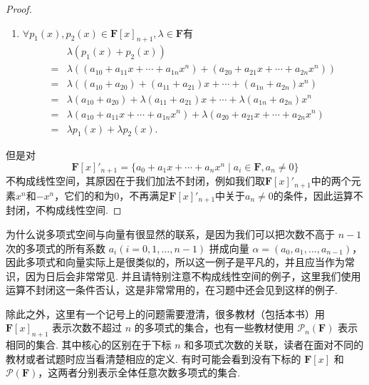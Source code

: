 \begin{proof}
\begin{enumerate}
        \item $\forall p_1(x), p_2(x) \in \mathbf{F}[x]_{n+1}, \lambda \in \mathbf{F}$有
              \begin{align*}
                      & \lambda(p_1(x) + p_2(x))                                                                        \\
                  ={} & \lambda((a_{10} + a_{11}x + \cdots + a_{1n}x^n) + (a_{20} + a_{21}x + \cdots + a_{2n}x^n))      \\
                  ={} & \lambda((a_{10} + a_{20}) + (a_{11} + a_{21})x + \cdots + (a_{1n} + a_{2n})x^n)                 \\
                  ={} & \lambda(a_{10} + a_{20}) + \lambda(a_{11} + a_{21})x + \cdots + \lambda(a_{1n} + a_{2n})x^n     \\
                  ={} & \lambda(a_{10} + a_{11}x + \cdots + a_{1n}x^n) + \lambda(a_{20} + a_{21}x + \cdots + a_{2n}x^n) \\
                  ={} & \lambda p_1(x) + \lambda p_2(x).
              \end{align*}
    \end{enumerate}
    但是对\[\mathbf{F}[x]'_{n+1}=\{a_0+a_1x+\cdots+a_nx^n \mid a_i\in\mathbf{F}, a_n\neq 0\}\]不构成线性空间，其原因在于我们加法不封闭，例如我们取$\mathbf{F}[x]'_{n+1}$中的两个元素$x^n$和$-x^n$，它们的和为$0$，不再满足$\mathbf{F}[x]'_{n+1}$中关于$a_n\neq 0$的条件，因此运算不封闭，不构成线性空间.
\end{proof}

为什么说多项式空间与向量有很显然的联系，是因为我们可以把次数不高于 $n-1$ 次的多项式的所有系数 $a_i(i=0,1,\ldots,n-1)$ 拼成向量 $\alpha=(a_0,a_1,\ldots,a_{n-1})$，因此多项式和向量实际上是很类似的，所以这一例子是平凡的，并且应当作为常识，因为日后会非常常见. 并且请特别注意不构成线性空间的例子，这里我们使用运算不封闭这一条件否认，这是非常常用的，在习题中还会见到这样的例子.

除此之外，这里有一个记号上的问题需要澄清，很多教材（包括本书）用 $\mathbf{F}[x]_{n+1}$ 表示次数不超过 $n$ 的多项式的集合，也有一些教材使用 $\mathcal{P}_n(\mathbf{F})$ 表示相同的集合. 其中核心的区别在于下标 $n$ 和多项式次数的关联，读者在面对不同的教材或者试题时应当看清楚相应的定义. 有时可能会看到没有下标的 $\mathbf{F}[x]$ 和 $\mathcal{P}(\mathbf{F})$，这两者分别表示全体任意次数多项式的集合.

